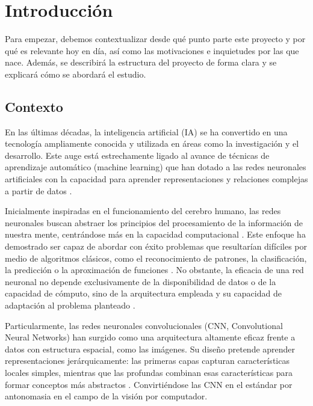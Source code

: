 \chapter{Introducción}\label{cap:introduccion}

Para empezar, debemos contextualizar desde qué punto parte este proyecto y por qué es relevante hoy en día, así como las motivaciones e inquietudes por las que nace. Además, se describirá la estructura del proyecto de forma clara y se explicará cómo se abordará el estudio.

\section{Contexto}

En las últimas décadas, la inteligencia artificial (IA) se ha convertido en una tecnología ampliamente conocida y utilizada en áreas como la investigación y el desarrollo. Este auge está estrechamente ligado al avance de técnicas de aprendizaje automático (machine learning) que han dotado a las redes neuronales artificiales con la capacidad para aprender representaciones y relaciones complejas a partir de datos \cite{dl__goodfellow_2016, dl_python__chollet_2021}.

Inicialmente inspiradas en el funcionamiento del cerebro humano, las redes neuronales buscan abstraer los principios del procesamiento de la información de nuestra mente, centrándose más en la capacidad computacional \cite{neurocomputing__hecht_nielsen_1998, rna_fundamentos__hilera_2021}. Este enfoque ha demostrado ser capaz de abordar con éxito problemas que resultarían difíciles por medio de algoritmos clásicos, como el reconocimiento de patrones, la clasificación, la predicción o la aproximación de funciones \cite{nn_fundamentals__thakur_2021}. No obstante, la eficacia de una red neuronal no depende exclusivamente de la disponibilidad de datos o de la capacidad de cómputo, sino de la arquitectura empleada y su capacidad de adaptación al problema planteado \cite{nn_dl__michael_nielsen_2015}.

Particularmente, las redes neuronales convolucionales (CNN, Convolutional Neural Networks) han surgido como una arquitectura altamente eficaz frente a datos con estructura espacial, como las imágenes. Su diseño pretende aprender representaciones jerárquicamente: las primeras capas capturan características locales simples, mientras que las profundas combinan esas características para formar conceptos más abstractos \cite{dl_python__chollet_2021, nn_dl__michael_nielsen_2015}. Convirtiéndose las CNN en el estándar por antonomasia en el campo de la visión por computador.

